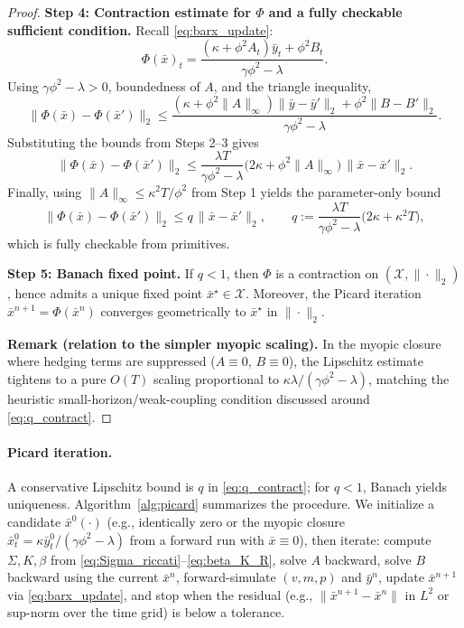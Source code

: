 \begin{proof}
\medskip\noindent
\textbf{Step 4: Contraction estimate for $\Phi$ and a fully checkable sufficient condition.}
Recall \eqref{eq:barx_update}:
\[
\Phi(\bar x)_t
=
\frac{(\kappa+\phi^2A_t)\bar y_t+\phi^2 B_t}{\gamma\phi^2-\lambda}.
\]
Using $\gamma\phi^2-\lambda>0$, boundedness of $A$, and the triangle inequality,
\[
\|\Phi(\bar x)-\Phi(\bar x')\|_2
\le
\frac{(\kappa+\phi^2\|A\|_\infty)\|\bar y-\bar y'\|_2+\phi^2\|B-B'\|_2}{\gamma\phi^2-\lambda}.
\]
Substituting the bounds from Steps 2--3 gives
\[
\|\Phi(\bar x)-\Phi(\bar x')\|_2
\le
\frac{\lambda T}{\gamma\phi^2-\lambda}\Big(2\kappa+\phi^2\|A\|_\infty\Big)\,\|\bar x-\bar x'\|_2.
\]
Finally, using $\|A\|_\infty\le \kappa^2T/\phi^2$ from Step 1 yields the parameter-only bound
\[
\|\Phi(\bar x)-\Phi(\bar x')\|_2
\le
q\,\|\bar x-\bar x'\|_2,
\qquad
q:=\frac{\lambda T}{\gamma\phi^2-\lambda}\Big(2\kappa+\kappa^2T\Big),
\]
which is fully checkable from primitives.

\medskip\noindent
\textbf{Step 5: Banach fixed point.}
If $q<1$, then $\Phi$ is a contraction on $(\mathcal X,\|\cdot\|_2)$, hence admits a unique fixed point
$\bar x^\star\in\mathcal X$. Moreover, the Picard iteration $\bar x^{n+1}=\Phi(\bar x^n)$ converges geometrically to
$\bar x^\star$ in $\|\cdot\|_2$.

\medskip\noindent
\textbf{Remark (relation to the simpler myopic scaling).}
In the myopic closure where hedging terms are suppressed ($A\equiv 0$, $B\equiv 0$), the Lipschitz estimate tightens to
a pure $O(T)$ scaling proportional to $\kappa\lambda/(\gamma\phi^2-\lambda)$, matching the heuristic
small-horizon/weak-coupling condition discussed around \eqref{eq:q_contract}.
\end{proof}

\paragraph{Picard iteration.}
A conservative Lipschitz bound is $q$ in \eqref{eq:q_contract}; for $q<1$, Banach yields uniqueness.
Algorithm~\ref{alg:picard} summarizes the procedure. We initialize a candidate $\bar x^0(\cdot)$ (e.g., identically zero or the myopic closure $\bar x_t^0 = \kappa\bar y_t^0/(\gamma\phi^2-\lambda)$ from a forward run with $\bar x\equiv 0$), then iterate: compute $\Sigma,K,\beta$ from \eqref{eq:Sigma_riccati}--\eqref{eq:beta_K_R}, solve $A$ backward, solve $B$ backward using the current $\bar x^n$, forward-simulate $(v,m,p)$ and $\bar y^n$, update $\bar x^{n+1}$ via \eqref{eq:barx_update}, and stop when the residual (e.g., $\|\bar x^{n+1}-\bar x^n\|$ in $L^2$ or sup-norm over the time grid) is below a tolerance.

